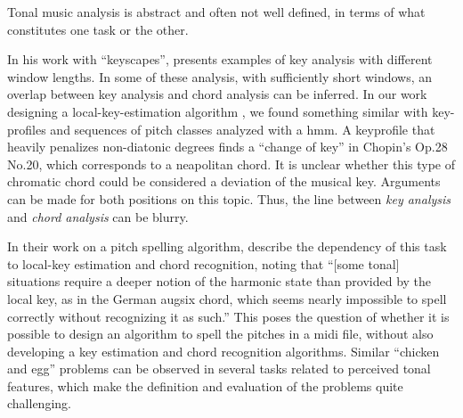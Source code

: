 

Tonal music analysis is abstract and often not well defined,
in terms of what constitutes one task or the other.


In his work with ``keyscapes'',
\textcite{sapp2011computational} presents examples of key
analysis with different window lengths. In some of these
analysis, with sufficiently short windows, an overlap
between key analysis and chord analysis can be inferred. In
our work designing a local-key-estimation algorithm
\parencite{napoleslopez2019keyfinding}, we found something
similar with key-profiles and sequences of pitch classes
analyzed with a \gls{hmm}. A \gls{keyprofile} that heavily
penalizes non-diatonic degrees finds a ``change of key'' in
Chopin's Op.28 No.20, which corresponds to a
\gls{neapolitan} chord. It is unclear whether this type of
chromatic chord could be considered a deviation of the
musical key. Arguments can be made for both positions on
this topic. Thus, the line between \emph{key analysis} and
\emph{chord analysis} can be blurry.


In their work on a pitch spelling algorithm,
\textcite{teodoru2007pitch} describe the dependency of this
task to local-key estimation and chord recognition, noting
that ``[some tonal] situations require a deeper notion of
the harmonic state than provided by the local key, as in the
German \gls{augsix} chord, which seems nearly impossible to
spell correctly without recognizing it as such.'' This poses
the question of whether it is possible to design an
algorithm to spell the pitches in a \gls{midi} file, without
also developing a key estimation and chord recognition
algorithms. Similar ``chicken and egg'' problems can be
observed in several tasks related to perceived tonal
features, which make the definition and evaluation of the
problems quite challenging.
